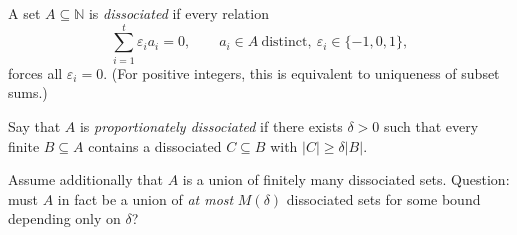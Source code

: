 A set \(A\subseteq\mathbb{N}\) is \emph{dissociated} if every relation
\[
\sum_{i=1}^t \varepsilon_i a_i = 0,\qquad a_i\in A\ \text{distinct},\ \varepsilon_i\in\{-1,0,1\},
\]
forces all \(\varepsilon_i=0\).
(For positive integers, this is equivalent to uniqueness of subset sums.)

Say that \(A\) is \emph{proportionately dissociated} if there exists \(\delta>0\) such that every finite \(B\subseteq A\) contains a dissociated \(C\subseteq B\) with \(|C|\ge \delta|B|\).

Assume additionally that \(A\) is a union of finitely many dissociated sets.
Question: must \(A\) in fact be a union of \emph{at most} \(M(\delta)\) dissociated sets for some bound depending only on \(\delta\)?
